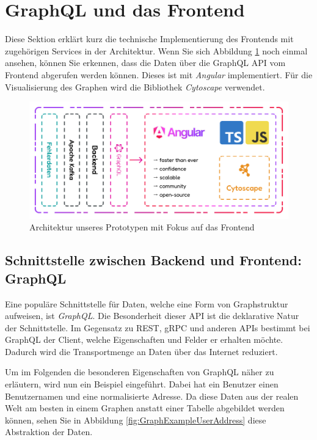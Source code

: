 \section{GraphQL und das Frontend}
\label{chp:architecture_frontend}

Diese Sektion erklärt kurz die technische Implementierung des Frontends mit zugehörigen Services in der Architektur. Wenn Sie sich Abbildung \ref{fig:FrontendArchitektur} noch einmal ansehen, können Sie erkennen, dass die Daten über die GraphQL API vom Frontend abgerufen werden können. Dieses ist mit \emph{Angular} implementiert. Für die Visualisierung des Graphen wird die Bibliothek \emph{Cytoscape} verwendet.

\begin{figure}
    \centering
    \includegraphics[width=1\textwidth]{content/img/Architecture/Architecture_Angular.jpg}
    \caption{Architektur unseres Prototypen mit Fokus auf das Frontend}
    \label{fig:FrontendArchitektur}
\end{figure}
\FloatBarrier

\subsection{Schnittstelle zwischen Backend und Frontend: GraphQL}

Eine populäre Schnittstelle für Daten, welche eine Form von Graphstruktur aufweisen, ist \emph{GraphQL}. Die Besonderheit dieser API ist die deklarative Natur der Schnittstelle. Im Gegensatz zu REST, gRPC und anderen APIs bestimmt bei GraphQL der Client, welche Eigenschaften und Felder er erhalten möchte. Dadurch wird die Transportmenge an Daten über das Internet reduziert. \cite{GraphQLWhyGraphQL}

Um im Folgenden die besonderen Eigenschaften von GraphQL näher zu erläutern, wird nun ein Beispiel eingeführt. Dabei hat ein Benutzer einen Benutzernamen und eine normalisierte Adresse. Da diese Daten aus der realen Welt am besten in einem Graphen anstatt einer Tabelle abgebildet werden können, sehen Sie in Abbildung \ref{fig:GraphExampleUserAddress} diese Abstraktion der Daten.

